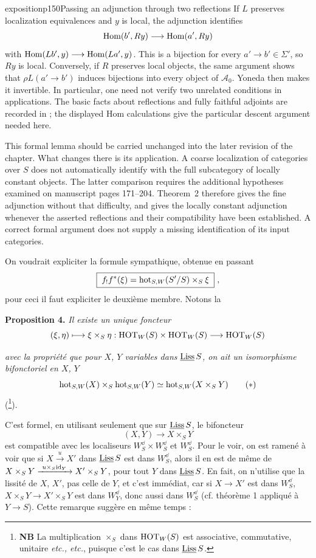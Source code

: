 \begin{dcomment}{exposition}{p150}{Passing an adjunction through two reflections}
If $L$ preserves localization equivalences and $y$ is local, the adjunction identifies
\[
 \mathrm{Hom}(b',Ry)\longrightarrow\mathrm{Hom}(a',Ry)
\]
with $\mathrm{Hom}(Lb',y)\longrightarrow\mathrm{Hom}(La',y)$. This is a bijection for every $a'\longrightarrow b'\in\Sigma'$, so $Ry$ is local. Conversely, if $R$ preserves local objects, the same argument shows that $\rho L(a'\longrightarrow b')$ induces bijections into every object of $\mathcal A_0$. Yoneda then makes it invertible. In particular, one need not verify two unrelated conditions in applications. The basic facts about reflections and fully faithful adjoints are recorded in \citet[Lemma~4.5.11 and Definition~4.5.12]{Riehl2016}; the displayed Hom calculations give the particular descent argument needed here.

This formal lemma should be carried unchanged into the later revision of the chapter. What changes there is its application. A coarse localization of categories over $S$ does not automatically identify with the full subcategory of locally constant objects. The latter comparison requires the additional hypotheses examined on manuscript pages 171--204. Theorem~2 therefore gives the fine adjunction without that difficulty, and gives the locally constant adjunction whenever the asserted reflections and their compatibility have been established. A correct formal argument does not supply a missing identification of its input categories.
\end{dcomment}


On voudrait expliciter la formule sympathique, obtenue en passant
\[
\boxed{\;f_!f^*(\xi) = \mathrm{hot}_{S,W}(S'/S) \times_S \xi\;}\ ,
\]
pour ceci il faut expliciter le deuxième membre. Notons la

\textbf{Proposition 4.} \textit{Il existe un unique foncteur}
\[
(\xi, \eta) \longmapsto \xi \times_S \eta : \mathrm{HOT}_W(S) \times \mathrm{HOT}_W(S) \longrightarrow \mathrm{HOT}_W(S)
\]



\textit{avec la propriété que pour $X$, $Y$ variables dans} $\underline{\mathrm{Liss}}\, S$\textit{, on ait un isomorphisme bifonctoriel en $X$, $Y$}
\[
\mathrm{hot}_{S,W}(X) \times_S \mathrm{hot}_{S,W}(Y) \simeq \mathrm{hot}_{S,W}(X \times_S Y)
\tag*{$(*)$}
\]
(\footnote[72]{\textbf{NB} La multiplication $\times_S$ dans $\mathrm{HOT}_W(S)$ est associative, commutative, unitaire \textit{etc., etc.}, puisque c'est le cas dans $\underline{\mathrm{Liss}}\, S$.}).

C'est formel, en utilisant seulement que sur $\underline{\mathrm{Liss}}\, S$, le bifoncteur
\[
(X, Y) \longrightarrow X \times_S Y
\]
est compatible avec les localiseurs $W^{\dd}_S \times W^{\dd}_S$ et $W^{\dd}_S$. Pour le voir, on est ramené à voir que si $X \xrightarrow{u} X'$ dans $\underline{\mathrm{Liss}}\, S$ est dans $W^{\dd}_S$, alors il en est de même de $X \times_S Y \xrightarrow{\ u\times_S \mathrm{id}_Y\ } X' \times_S Y$, pour tout
$Y$ dans $\underline{\mathrm{Liss}}\, S$. En fait, on n'utilise que la lissité de $X$, $X'$, pas celle de $Y$, et c'est immédiat, car si $X \longrightarrow X'$ est dans $W^{\dd}_S$, $X \times_S Y \longrightarrow X' \times_S Y$ est dans $W^{\dd}_Y$, donc aussi dans $W^{\dd}_S$ (cf. théorème 1 appliqué à $Y \longrightarrow S$). Cette remarque suggère en même temps :

